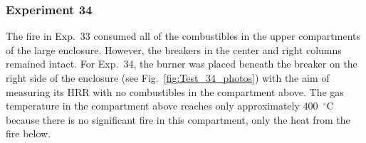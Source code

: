 \clearpage

\subsubsection{Experiment 34}

The fire in Exp.~33 consumed all of the combustibles in the upper compartments of the large enclosure. However, the breakers in the center and right columns remained intact. For Exp.~34, the burner was placed beneath the breaker on the right side of the enclosure (see Fig.~\ref{fig:Test_34_photos}) with the aim of measuring its HRR with no combustibles in the compartment above. The gas temperature in the compartment above reaches only approximately 400~$^\circ$C because there is no significant fire in this compartment, only the heat from the fire below.

